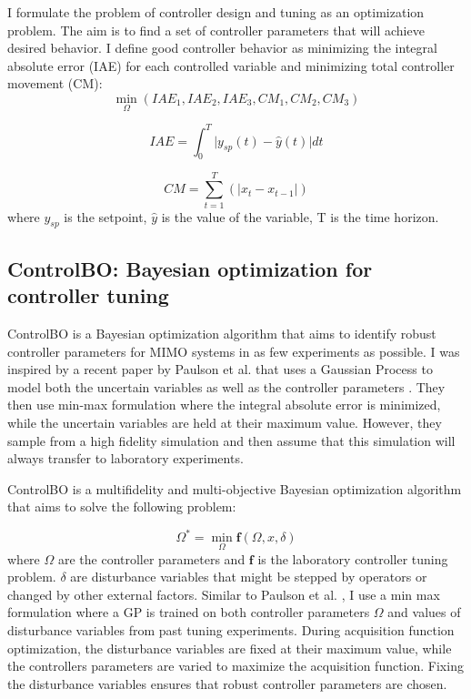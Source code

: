I formulate the problem of controller design and tuning as an optimization problem. The aim is to find a set of controller parameters that will achieve desired behavior. I define good controller behavior as minimizing the integral absolute error (IAE) for each controlled variable and minimizing total controller movement (CM):
\begin{equation}
    \min_{\Omega}(IAE_1, IAE_2, IAE_3, CM_1, CM_2, CM_3)
\end{equation}


\begin{equation}
    IAE = \int_0^T \vert y_{sp}(t) - \hat y(t) \vert dt
\end{equation}

\begin{equation}
    CM = \sum_{t=1}^{T}( \vert x_t - x_{t-1} \vert)
\end{equation}
where $y_{sp}$ is the setpoint,  $\hat y$  is the value of  the variable, T is the time horizon. 

\subsection{ControlBO: Bayesian optimization for controller tuning}

ControlBO is a Bayesian optimization algorithm that aims to identify robust controller parameters for MIMO systems in as few experiments as possible. I was inspired by a recent paper by Paulson et al. that uses a Gaussian Process to model both the uncertain variables as well as the controller parameters \cite{Paulson2022}. They then use min-max formulation where the integral absolute error is minimized, while the uncertain variables are held at their maximum value. However, they sample from a high fidelity simulation and then assume that this simulation will always transfer to laboratory experiments.

ControlBO is a multifidelity and multi-objective Bayesian optimization algorithm that aims to solve the following problem:

\begin{equation}
    \Omega^* = \min_{\Omega} \mathbf f(\Omega, x, \delta)
\end{equation}
where $\Omega$ are the controller parameters and $\mathbf f$ is the laboratory controller tuning problem. $\delta$ are disturbance variables that might be stepped by operators or changed by other external factors. Similar to Paulson et al. \cite{Paulson2022}, I use a min max formulation where a GP is trained on both controller parameters $\Omega$ and values of disturbance variables from past tuning experiments. During acquisition function optimization, the disturbance variables are fixed at their maximum value, while the controllers parameters are varied to maximize the acquisition function. Fixing the disturbance variables ensures that robust controller parameters are chosen.

